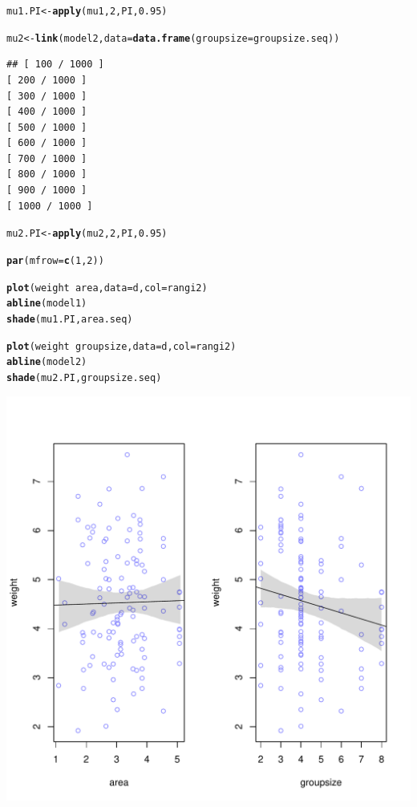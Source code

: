 \documentclass[12pt]{article}\usepackage[]{graphicx}\usepackage[]{color}
\makeatletter
\def\maxwidth{ %
  \ifdim\Gin@nat@width>\linewidth
    \linewidth
  \else
    \Gin@nat@width
  \fi
}
\newcommand{\hlnum}[1]{\textcolor[rgb]{0.686,0.059,0.569}{#1}}%
\newcommand{\hlopt}[1]{\textcolor[rgb]{0,0,0}{#1}}%
\newcommand{\hlstd}[1]{\textcolor[rgb]{0.345,0.345,0.345}{#1}}%
\newcommand{\hlkwb}[1]{\textcolor[rgb]{0.69,0.353,0.396}{#1}}%
\newcommand{\hlkwc}[1]{\textcolor[rgb]{0.333,0.667,0.333}{#1}}%
\newcommand{\hlkwd}[1]{\textcolor[rgb]{0.737,0.353,0.396}{\textbf{#1}}}%
\newenvironment{kframe}{%
 \def\at@end@of@kframe{}%
 \ifinner\ifhmode%
  \def\at@end@of@kframe{\end{minipage}}%
  \begin{minipage}{\columnwidth}%
 \fi\fi%
 \def\FrameCommand##1{\hskip\@totalleftmargin \hskip-\fboxsep
 \colorbox{shadecolor}{##1}\hskip-\fboxsep
     \hskip-\linewidth \hskip-\@totalleftmargin \hskip\columnwidth}%
 \MakeFramed {\advance\hsize-\width
   \@totalleftmargin\z@ \linewidth\hsize
   \@setminipage}}%
 {\par\unskip\endMakeFramed%
 \at@end@of@kframe}
\newenvironment{knitrout}{}{} %
\makeatother
\begin{document}
\begin{knitrout}
\begin{kframe}
\begin{verbatim}
\end{verbatim}
\begin{alltt}
\hlstd{mu1.PI} \hlkwb{<-} \hlkwd{apply}\hlstd{(mu1,} \hlnum{2}\hlstd{, PI,} \hlnum{0.95}\hlstd{)}

\hlstd{mu2} \hlkwb{<-} \hlkwd{link}\hlstd{(model2,} \hlkwc{data} \hlstd{=} \hlkwd{data.frame}\hlstd{(}\hlkwc{groupsize} \hlstd{= groupsize.seq))}
\end{alltt}
\begin{verbatim}
## [ 100 / 1000 ]
[ 200 / 1000 ]
[ 300 / 1000 ]
[ 400 / 1000 ]
[ 500 / 1000 ]
[ 600 / 1000 ]
[ 700 / 1000 ]
[ 800 / 1000 ]
[ 900 / 1000 ]
[ 1000 / 1000 ]

\end{verbatim}
\begin{alltt}
\hlstd{mu2.PI} \hlkwb{<-} \hlkwd{apply}\hlstd{(mu2,} \hlnum{2}\hlstd{, PI,} \hlnum{0.95}\hlstd{)}

\hlkwd{par}\hlstd{(}\hlkwc{mfrow}\hlstd{=}\hlkwd{c}\hlstd{(}\hlnum{1}\hlstd{,}\hlnum{2}\hlstd{))}

\hlkwd{plot}\hlstd{(weight} \hlopt{~} \hlstd{area,} \hlkwc{data} \hlstd{= d,} \hlkwc{col}\hlstd{=rangi2)}
\hlkwd{abline}\hlstd{(model1)}
\hlkwd{shade}\hlstd{(mu1.PI, area.seq)}

\hlkwd{plot}\hlstd{(weight} \hlopt{~} \hlstd{groupsize,} \hlkwc{data} \hlstd{= d,} \hlkwc{col} \hlstd{= rangi2)}
\hlkwd{abline}\hlstd{(model2)}
\hlkwd{shade}\hlstd{(mu2.PI, groupsize.seq)}
\end{alltt}
\end{kframe}
\includegraphics[width=\maxwidth]{figure/unnamed-chunk-5-1} 

\end{knitrout}
\end{document}
